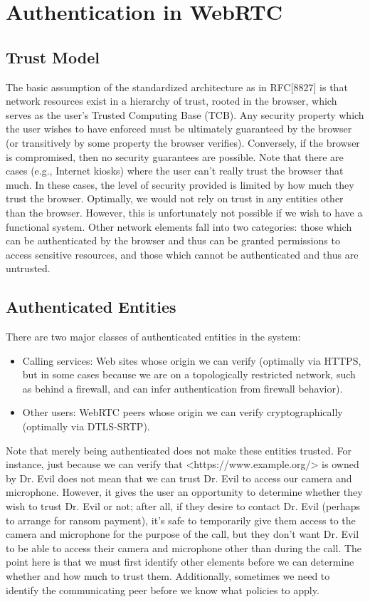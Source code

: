 \documentclass[conference]{IEEEtran}
\begin{document}
\section{Authentication in WebRTC}
\subsection{Trust Model}

The basic assumption of the standardized architecture as in RFC[8827]\cite{RFC8827} is that network resources exist in a hierarchy of trust, rooted in the browser, 
which serves as the user's Trusted Computing Base (TCB). Any security property which the user wishes to have enforced must be 
ultimately guaranteed by the browser (or transitively by some property the browser verifies). Conversely, if the browser is 
compromised, then no security guarantees are possible. Note that there are cases (e.g., Internet kiosks) where the user can't 
really trust the browser that much. In these cases, the level of security provided is limited by how much they trust the browser.
Optimally, we would not rely on trust in any entities other than the browser. However, this is unfortunately not possible 
if we wish to have a functional system. Other network elements fall into two categories: those which can be authenticated by 
the browser and thus can be granted permissions to access sensitive resources, and those which cannot be authenticated and 
thus are untrusted.

\subsection{Authenticated Entities}
There are two major classes of authenticated entities in the system:
\begin{itemize}
    \item Calling services: Web sites whose origin we can verify (optimally via HTTPS, but in some cases because we are on a topologically restricted 
    network, such as behind a firewall, and can infer authentication from firewall behavior).
    \item Other users: WebRTC peers whose origin we can verify cryptographically (optimally via DTLS-SRTP).
\end{itemize}

Note that merely being authenticated does not make these entities trusted. For instance, just because we can verify that 
<https://www.example.org/> is owned by Dr. Evil does not mean that we can trust Dr. Evil to access our camera and microphone. 
However, it gives the user an opportunity to determine whether they wish to trust Dr. Evil or not; after all, if they desire to 
contact Dr. Evil (perhaps to arrange for ransom payment), it's safe to temporarily give them access to the camera and microphone 
for the purpose of the call, but they don't want Dr. Evil to be able to access their camera and microphone other than during the 
call. The point here is that we must first identify other elements before we can determine whether and how much to trust them.
 Additionally, sometimes we need to identify the communicating peer before we know what policies to apply.
\end{document}
